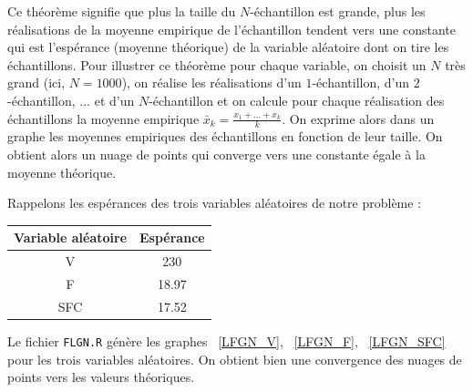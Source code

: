\documentclass{article}
\begin{document}
Ce théorème signifie que plus la taille du $N$-échantillon est grande, plus les réalisations de la moyenne empirique de l'échantillon tendent vers une constante qui est l'espérance (moyenne théorique) de la variable aléatoire dont on tire les échantillons.
Pour illustrer ce théorème pour chaque variable, on choisit un $N$ très grand (ici, $N=1000$), on réalise les réalisations d'un $1$-échantillon, d'un $2$-échantillon, ... et d'un $N$-échantillon et on calcule pour chaque réalisation des échantillons la moyenne empirique  $\bar{x}_{k}=\frac{x_{1}+...+x_{k}}{k}$. On exprime alors dans un graphe les moyennes empiriques des échantillons en fonction de leur taille. On obtient alors un nuage de points qui converge vers une constante égale à la moyenne théorique.

Rappelons les espérances des trois variables aléatoires de notre problème :
\begin{center}
   \begin{tabular}{ | c | c | }
     \hline
     Variable aléatoire & Espérance\\ \hline
     V & 230 \\ \hline
     F & 18.97 \\ \hline
     SFC & 17.52 \\
     \hline
   \end{tabular}
 \end{center}
 
Le fichier \texttt{FLGN.R} génère les graphes ~\ref{LFGN_V}, ~\ref{LFGN_F}, ~\ref{LFGN_SFC} pour les trois variables aléatoires. On obtient bien une convergence des nuages de points vers les valeurs théoriques.  
\end{document}
